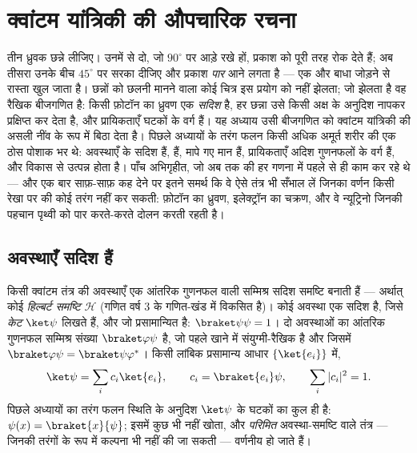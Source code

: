 \chapter{क्वांटम यांत्रिकी की औपचारिक रचना}\label{ch:b3:quantum-formalism}

तीन ध्रुवक छन्ने लीजिए। उनमें से दो, जो $90^\circ$ पर आड़े रखे हों,
प्रकाश को पूरी तरह रोक देते हैं; अब तीसरा उनके बीच $45^\circ$ पर सरका
दीजिए और प्रकाश \emph{पार} आने लगता है --- एक और बाधा जोड़ने से रास्ता
खुल जाता है। छन्नों को छलनी मानने वाला कोई चित्र इस प्रयोग को नहीं झेलता;
जो झेलता है वह रैखिक बीजगणित है: किसी फ़ोटॉन का ध्रुवण एक
\emph{सदिश} है, हर छन्ना उसे किसी अक्ष के अनुदिश नापकर प्रक्षिप्त कर
देता है, और प्रायिकताएँ घटकों के वर्ग हैं। यह अध्याय उसी बीजगणित को
क्वांटम यांत्रिकी की असली नींव के रूप में बिठा देता है। पिछले अध्यायों
के तरंग फलन किसी अधिक अमूर्त शरीर की एक ठोस पोशाक भर थे: अवस्थाएँ
 के सदिश हैं,
  हैं, मापे गए मान  हैं,
प्रायिकताएँ अदिश गुणनफलों के वर्ग हैं, और विकास
 से उत्पन्न होता है। पाँच अभिगृहीत, जो अब तक की हर गणना में
पहले से ही काम कर रहे थे --- और एक बार साफ़-साफ़ कह देने पर इतने समर्थ
कि वे ऐसे तंत्र भी सँभाल लें जिनका वर्णन किसी रेखा पर की कोई तरंग नहीं
कर सकती: फ़ोटॉन का ध्रुवण, इलेक्ट्रॉन का चक्रण, और वे न्यूट्रिनो जिनकी
पहचान पृथ्वी को पार करते-करते दोलन करती रहती है।

\section{अवस्थाएँ सदिश हैं}

\begin{definition}\label{def:b3:quantum-formalism:state}
किसी क्वांटम तंत्र की अवस्थाएँ एक आंतरिक गुणनफल वाली सम्मिश्र सदिश
समष्टि बनाती हैं --- अर्थात् कोई \emph{हिल्बर्ट समष्टि} $\mathcal H$
(गणित वर्ष 3 के गणित-खंड में विकसित है)। कोई अवस्था
एक सदिश है, जिसे \emph{केट} $\ket\psi$ लिखते हैं, और जो प्रसामान्यित है:
$\braket\psi\psi = 1$। दो अवस्थाओं का आंतरिक गुणनफल सम्मिश्र
संख्या $\braket\varphi\psi$ है, जो पहले खाने में संयुग्मी-रैखिक है और
जिसमें $\braket\varphi\psi = \braket\psi\varphi^*$। किसी लांबिक
प्रसामान्य आधार $\{\ket{e_i}\}$ में,
\[
\ket\psi = \sum_i c_i\ket{e_i} , \qquad
c_i = \braket{e_i}\psi , \qquad
\sum_i|c_i|^2 = 1 .
\]
पिछले अध्यायों का तरंग फलन स्थिति के अनुदिश
$\ket\psi$ के घटकों का कुल ही है: $\psi(x) =
\braket{x}{\psi}$; इसमें कुछ भी नहीं खोता, और \emph{परिमित}
अवस्था-समष्टि वाले तंत्र --- जिनकी तरंगों के रूप में कल्पना भी नहीं की
जा सकती --- वर्णनीय हो जाते हैं।
\end{definition}

